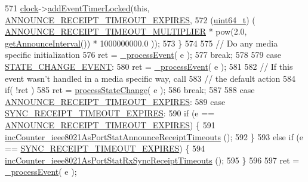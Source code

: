 \begin{DoxyCode}
571             \hyperlink{class_common_port_aa2bc8731fa5aeb5b033feebc2b67258c}{clock}->\hyperlink{class_i_e_e_e1588_clock_a4747f09108bd78ecd68d58dad4358d77}{addEventTimerLocked}(\textcolor{keyword}{this}, 
      \hyperlink{ieee1588_8hpp_a5667b805d857c6d28f83f6038a0272d3a7060ecc9be507f5c8828eedf6a163c8b}{ANNOUNCE\_RECEIPT\_TIMEOUT\_EXPIRES},
572                 (\hyperlink{parse_8c_aec6fcb673ff035718c238c8c9d544c47}{uint64\_t}) ( \hyperlink{common__port_8hpp_aeda88e4edf1cca8ee8e367150c8004b5}{ANNOUNCE\_RECEIPT\_TIMEOUT\_MULTIPLIER}
       * pow(2.0, \hyperlink{class_common_port_a7aa1a5fddf7129f600c97c018087b7b8}{getAnnounceInterval}()) * 1000000000.0 ));
573         \}
574 
575         \textcolor{comment}{// Do any media specific initialization}
576         ret = \hyperlink{class_common_port_a8fdf705ad3f9d8794555fe1c611c19ec}{\_processEvent}( e );
577         \textcolor{keywordflow}{break};
578 
579     \textcolor{keywordflow}{case} \hyperlink{ieee1588_8hpp_a5667b805d857c6d28f83f6038a0272d3a39c91cfde69942bacf91a19587379be1}{STATE\_CHANGE\_EVENT}:
580         ret = \hyperlink{class_common_port_a8fdf705ad3f9d8794555fe1c611c19ec}{\_processEvent}( e );
581 
582         \textcolor{comment}{// If this event wasn't handled in a media specific way, call}
583         \textcolor{comment}{// the default action}
584         \textcolor{keywordflow}{if}( !ret )
585             ret = \hyperlink{class_common_port_a11047fcdc1e80ee322dba467a051698b}{processStateChange}( e );
586         \textcolor{keywordflow}{break};
587 
588     \textcolor{keywordflow}{case} \hyperlink{ieee1588_8hpp_a5667b805d857c6d28f83f6038a0272d3a7060ecc9be507f5c8828eedf6a163c8b}{ANNOUNCE\_RECEIPT\_TIMEOUT\_EXPIRES}:
589     \textcolor{keywordflow}{case} \hyperlink{ieee1588_8hpp_a5667b805d857c6d28f83f6038a0272d3ac09ed008614f57d58759e4fd5a3c9622}{SYNC\_RECEIPT\_TIMEOUT\_EXPIRES}:
590         \textcolor{keywordflow}{if} (e == \hyperlink{ieee1588_8hpp_a5667b805d857c6d28f83f6038a0272d3a7060ecc9be507f5c8828eedf6a163c8b}{ANNOUNCE\_RECEIPT\_TIMEOUT\_EXPIRES}) \{
591             \hyperlink{class_common_port_a05a0d76025b1ab762b3f27232d0090a5}{incCounter\_ieee8021AsPortStatAnnounceReceiptTimeouts}
      ();
592         \}
593         \textcolor{keywordflow}{else} \textcolor{keywordflow}{if} (e == \hyperlink{ieee1588_8hpp_a5667b805d857c6d28f83f6038a0272d3ac09ed008614f57d58759e4fd5a3c9622}{SYNC\_RECEIPT\_TIMEOUT\_EXPIRES}) \{
594             \hyperlink{class_common_port_adf1a589504e919c03125807f4d10e9e2}{incCounter\_ieee8021AsPortStatRxSyncReceiptTimeouts}
      ();
595         \}
596 
597         ret = \hyperlink{class_common_port_a8fdf705ad3f9d8794555fe1c611c19ec}{\_processEvent}( e );

\end{DoxyCode}
